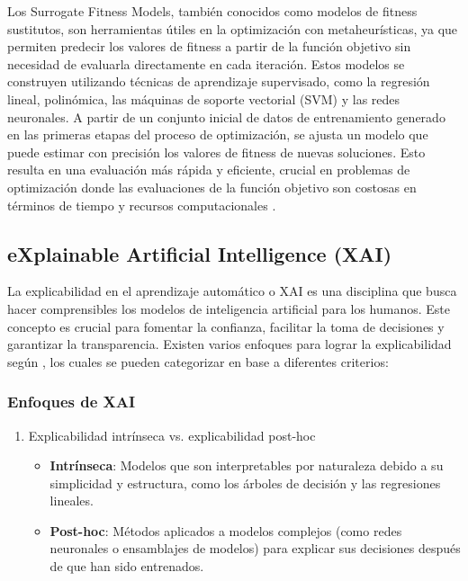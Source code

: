 \vspace{1mm}
\normalsize

Los Surrogate Fitness Models, también conocidos como modelos de fitness sustitutos, son herramientas útiles en la optimización con metaheurísticas, ya que permiten predecir los valores de fitness a partir de la función objetivo sin necesidad de evaluarla directamente en cada iteración. Estos modelos se construyen utilizando técnicas de aprendizaje supervisado, como la regresión lineal, polinómica, las máquinas de soporte vectorial (SVM) y las redes neuronales. A partir de un conjunto inicial de datos de entrenamiento generado en las primeras etapas del proceso de optimización, se ajusta un modelo que puede estimar con precisión los valores de fitness de nuevas soluciones. Esto resulta en una evaluación más rápida y eficiente, crucial en problemas de optimización donde las evaluaciones de la función objetivo son costosas en términos de tiempo y recursos computacionales \cite{10138291, Jin2005_te}.


\vspace{2mm}





\subsection{eXplainable Artificial Intelligence (XAI)}

\vspace{1mm}
\normalsize

La explicabilidad en el aprendizaje automático o XAI es una disciplina que busca hacer comprensibles los modelos de inteligencia artificial para los humanos. Este concepto es crucial para fomentar la confianza, facilitar la toma de decisiones y garantizar la transparencia. Existen varios enfoques para lograr la explicabilidad según \cite{das2020opportunitieschallengesexplainableartificial}, los cuales se pueden categorizar en base a diferentes criterios:

\subsubsection{Enfoques de XAI}

\begin{enumerate}
    \item{Explicabilidad intrínseca vs. explicabilidad post-hoc}
    \begin{itemize}
        \item \textbf{Intrínseca}: Modelos que son interpretables por naturaleza debido a su simplicidad y estructura, como los árboles de decisión y las regresiones lineales.
        \item \textbf{Post-hoc}: Métodos aplicados a modelos complejos (como redes neuronales o ensamblajes de modelos) para explicar sus decisiones después de que han sido entrenados.
    \end{itemize}
\end{enumerate}


